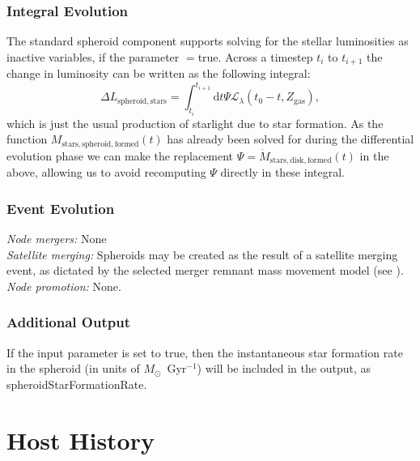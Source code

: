 \subsubsection{Integral Evolution}

The standard spheroid component supports solving for the stellar luminosities as inactive variables, if the parameter {\normalfont \ttfamily [spheroidLuminositiesStellarInactive]}$=${\normalfont \ttfamily true}. Across a timestep $t_i$ to $t_{i+1}$ the change in luminosity can be written as the following integral:
\begin{equation}
\Delta L_\mathrm{spheroid, stars} = \int_{t_{i}}^{t_{i+1}} \mathrm{d}t \Psi \mathcal{L}_\lambda(t_0-t,Z_\mathrm{gas}),
\end{equation}
which is just the usual production of starlight due to star formation. As the function $M_\mathrm{stars, spheroid, formed}(t)$ has already been solved for during the differential evolution phase we can make the replacement $\Psi = \dot{M}_\mathrm{stars, disk, formed}(t)$ in the above, allowing us to avoid recomputing $\Psi$ directly in these integral.

\subsubsection{Event Evolution}

\noindent\emph{Node mergers:} None\\

\noindent\emph{Satellite merging:} Spheroids may be created as the result of a satellite merging event, as dictated by the selected merger remnant mass movement model (see ).\\

\noindent\emph{Node promotion:} None.\\

\subsubsection{Additional Output}

If the {\normalfont \ttfamily [spheroidOutputStarFormationRate]} input parameter is set to true, then the instantaneous star formation rate in the spheroid (in units of $M_\odot$~Gyr$^{-1}$) will be included in the output, as {\normalfont \ttfamily spheroidStarFormationRate}.

\section{Host History}

